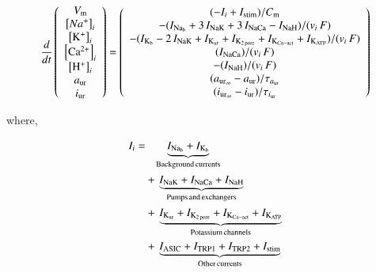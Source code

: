 \begin{equation}
  \frac{d}{dt}
  \left(
    \begin{array}{c}
      V_{\rm m}\\
      \left[Na^{+}\right]_{i}\\
      \left[\rm K^{+}\right]_{i}\\
      \left[\rm Ca^{2+}\right]_{i}\\
      \left[\rm H^{+}\right]_{i}\\
      a_{\rm ur}\\
      i_{\rm ur}\\
    \end{array}
  \right)  = \left(
    \begin{array}{c}
        (-I_{i} + I_{\rm stim})/{C_{\rm m}}\\
      - (I_{\rm Na_{b}} + 3\, I_{\rm NaK} + 3\, I_{\rm NaCa} - I_{\rm
        NaH})/(v_{i}\, F)\\
      - (I_{\rm K_{b}} - 2\, I_{\rm NaK} + I_{\rm K_{ur}} + I_{\rm
        K_{2\, pore}} + I_{\rm K_{Ca-act}} + I_{\rm K_{ATP}})/(v_{i}\,
      F)\\
        (I_{\rm NaCa})/(v_{i}\, F)\\
      - (I_{\rm NaH})/(v_{i}\, F)\\
      (a_{{\rm ur}_{\infty}} - a_{\rm ur})/\tau_{a_{\rm ur}}\\
      (i_{{\rm ur}_{\infty}} - i_{\rm ur})/\tau_{i_{\rm ur}}\\
    \end{array}
  \right)
\end{equation}

\noindent where,

\begin{displaymath}
    \begin{split}
      I_{i} =
      & \phantom{+\,} \underbrace{I_{\rm Na_b} + I_{\rm K_b}}_{\rm
        Background\, currents}\\
      & +\, \underbrace{I_{\rm NaK} + I_{\rm NaCa} + I_{\rm NaH}}_{\rm
        Pumps\, and\, exchangers}\\
      & +\, \underbrace{I_{\rm K_{ur}} + I_{\rm K_{2\, pore}} + I_{\rm
          K_{Ca-act}} + I_{\rm K_{ATP}}}_{\rm Potassium\, channels}\\
      & +\, \underbrace{I_{\rm ASIC} + I_{\rm TRP1} + I_{\rm TRP2} +
        I_{\rm stim}}_{\rm Other\, currents}
    \end{split}
\end{displaymath}

